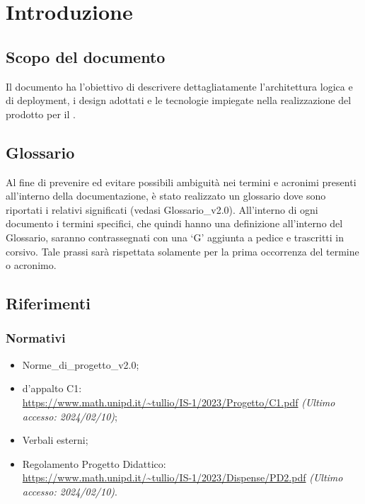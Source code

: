 \chapter{Introduzione} \label{cap:intro}
\section{Scopo del documento}
Il documento ha l'obiettivo di descrivere dettagliatamente l'architettura logica e di deployment, i design  adottati e le tecnologie impiegate nella realizzazione del prodotto per il   .
\section{Glossario}
Al fine di prevenire ed evitare possibili ambiguità nei termini e acronimi presenti all’interno della documentazione, è stato realizzato un glossario dove sono riportati i relativi significati (vedasi Glossario\_v2.0). All’interno di ogni documento i termini specifici, che quindi hanno una definizione all’interno del Glossario, saranno contrassegnati con una ‘G’ aggiunta a pedice e trascritti in corsivo. Tale prassi sarà rispettata solamente per la prima occorrenza del termine o acronimo.
\section{Riferimenti}
\subsection{Normativi}
\begin{itemize}
    \item Norme\_di\_progetto\_v2.0;
    \item {} d'appalto C1: \\ \url{https://www.math.unipd.it/~tullio/IS-1/2023/Progetto/C1.pdf} \textit{(Ultimo accesso: 2024/02/10)};
    \item Verbali esterni;
    \item Regolamento Progetto Didattico: \\
    \url{https://www.math.unipd.it/~tullio/IS-1/2023/Dispense/PD2.pdf} \textit{(Ultimo accesso: 2024/02/10)}.
\end{itemize}

